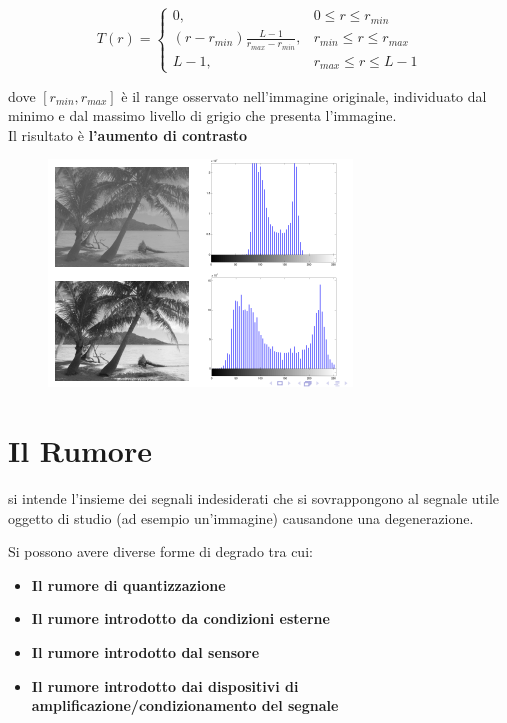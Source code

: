 $$
    T(r) =
    \begin{cases}
        0,                                         & 0 \le r \le r_{min}       \\
        (r - r_{min}) \frac{L-1}{r_{max}-r_{min}}, & r_{min} \le r \le r_{max} \\
        L-1,                                       & r_{max} \le r \le L-1
    \end{cases}
$$

dove $[r_{min}, r_{max} ]$ è il range osservato nell'immagine originale,
individuato dal minimo e dal massimo livello di grigio che presenta l'immagine.
\\Il risultato è \textbf{l'aumento di contrasto}

\begin{figure}[H]
    \centering
    \includegraphics[width=\linewidth, keepaspectratio]{capitoli/immagini/imgs/stretch-isto.png}
\end{figure}

\section{Il Rumore}

\begin{definition}
    si intende l'insieme dei segnali indesiderati che si sovrappongono al segnale utile oggetto di studio (ad esempio un'immagine) causandone una degenerazione.
\end{definition}

Si possono avere diverse forme di degrado tra cui:
\begin{itemize}
    \item \textbf{Il rumore di quantizzazione}
    \item \textbf{Il rumore introdotto da condizioni esterne}
    \item \textbf{Il rumore introdotto dal sensore}
    \item \textbf{Il rumore introdotto dai dispositivi di
              amplificazione/condizionamento del segnale}
\end{itemize}

